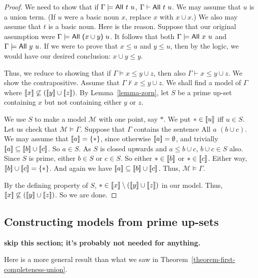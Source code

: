 \documentclass[12pt]{article}
\theoremstyle{definition}
\newcommand{\semantics}[1]{[\![\mbox{\em $ #1 $\/}]\!]}
\newcommand{\Model}{\mathcal{M}}
\newcommand{\set}[1]{\{ #1 \}}
\newcommand{\proves}{\vdash}
\begin{document}
\begin{proof}
We need to show that if $\Gamma\models \mbox{\sf All $t$ $u$}$,
$\Gamma\proves \mbox{\sf All $t$ $u$}$.
We may assume that $u$ is a union term.  (If $u$ were a basic noun $x$, replace $x$ with $x\cup x$.)
We also may assume that $t$ is a basic noun.   Here is the reason.   Suppose that our original assumption were
$\Gamma\models \mbox{\sf All ($x\cup y$) $u$}$.   It follows that both $\Gamma\models \mbox{\sf All $x$ $u$}$
and $\Gamma\models \mbox{\sf All $y$ $u$}$.   If we were to prove that $x \leq u$ and $y\leq u$, then by the logic,
we would have our desired conclusion:
$x\cup y \leq y$.

Thus, we reduce to showing that if  $\Gamma\models x\leq y \cup z$, then also  $\Gamma \proves x\leq y \cup z$.
We show the contrapositive.   Assume
 that $\Gamma\not\proves x\leq y \cup z$.   We shall find a model of $\Gamma$ where
$ \semantics{x} \not\subseteq (\semantics{y}\cup\semantics{z})$.
By Lemma~\ref{lemma-zorn}, let $S$ be a prime up-set containing $x$ but not containing either $y$ or $z$.

We use $S$ to make a model $\Model$ with one point, say $*$.   We put $*\in \semantics{u}$ iff $u\in S$.
Let us check that $\Model\models \Gamma$.  
Suppose that $\Gamma$ contains the sentence {\sf All $ a$ $(b\cup c)$.}    We may assume that $\semantics{a} = \set{*}$, 
since otherwise $\semantics{a} = \emptyset$, and trivially $\semantics{a}\subseteq \semantics{b}\cup\semantics{c}$.
So $a \in S$.  As $S$ is closed upwards and $a\leq b\cup c$, $b\cup c\in S$ also.   Since $S$ is prime, either $b\in S$ or $c\in S$.
So either $*\in\semantics{b}$ or $*\in \semantics{c}$.  Either way, $\semantics{b}\cup\semantics{c} = \set{*}$.  And again we have 
$\semantics{a}\subseteq \semantics{b}\cup\semantics{c}$.
Thus, $\Model\models \Gamma$.  

By the defining property of $S$, $*\in \semantics{x} \setminus (\semantics{y}\cup\semantics{z})$ in our model.   Thus, 
$ \semantics{x} \not\subseteq (\semantics{y}\cup\semantics{z})$.
So we are done.
\end{proof}

\subsection{Constructing models from prime up-sets}

{\bf skip this section; it's probably not needed for anything.}

Here is a more general result than what we saw in Theorem~\ref{theorem-first-completeness-union}.
\end{document}
